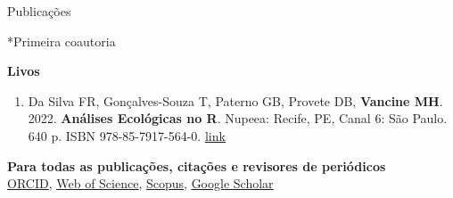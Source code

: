 \documentclass{resume}
\begin{document}
\begin{rSection}{Publicações}
\begin{enumerate}
\end{enumerate} 

*Primeira coautoria

{\bf Livos}

\begin{enumerate} 
\item Da Silva FR, Gonçalves-Souza T, Paterno GB, Provete DB, {\bf Vancine MH}. 2022. {\bf Análises Ecológicas no R}. Nupeea: Recife, PE, Canal 6: São Paulo. 640 p. ISBN 978-85-7917-564-0. \href{https://analises-ecologicas.com/}{\underline{link}}
\end{enumerate} 

{\bf Para todas as publicações, citações e revisores de periódicos}
\\\href{https://orcid.org/0000-0001-9650-7575}{\underline{ORCID}}, \href{https://www.webofscience.com/wos/author/record/837504}{\underline{Web of Science}}, \href{https://www.scopus.com/authid/detail.uri?authorId=57193451888}{\underline{Scopus}}, \href{https://scholar.google.com/citations?user=i-2xZBQAAAAJ}{\underline{Google Scholar}}

\end{rSection}

\end{document}
